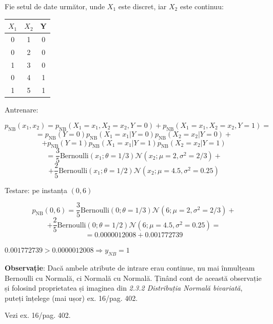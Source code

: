 \documentclass[12pt]{article}
\begin{document}
	Fie setul de date următor, unde $X_1$ este discret, iar $X_2$ este continuu:
	
	\begin{center}
		\begin{tabular}{ c|c||c }
			$X_1$ & $X_2$ & Y \\ 
			\hline
			 0& 1 & 0 \\  
			 0& 2 & 0 \\  
 			 1& 3 & 0 \\  
			 0& 4 & 1 \\  
			 1& 5 & 1 \\  
		\end{tabular}
	\end{center}
	
	Antrenare:
	
	$$p_\text{NB}(x_1,x_2) = p_\text{NB}(X_1=x_1,X_2=x_2,Y=0) + p_\text{NB}(X_1=x_1,X_2=x_2,Y=1) = $$
	$$ = p_\text{NB}(Y=0) p_\text{NB}(X_1=x_1|Y=0) p_\text{NB}(X_2=x_2|Y=0) +$$
	$$+ p_\text{NB}(Y=1) p_\text{NB}(X_1=x_1|Y=1) p_\text{NB}(X_2=x_2|Y=1) $$
	$$= \frac{3}{5} \text{Bernoulli}(x_1;\theta=1/3) \mathcal{N}(x_2;\mu=2,\sigma^2=2/3) + $$
	$$ + \frac{2}{5} \text{Bernoulli}(x_1;\theta=1/2) \mathcal{N}(x_2;\mu=4.5,\sigma^2=0.25)$$
	
	Testare: pe instanța $(0,6)$
	
	$$p_\text{NB}(0,6) = \frac{3}{5} \text{Bernoulli}(0;\theta=1/3) \mathcal{N}(6;\mu=2,\sigma^2=2/3) + $$
	$$ + \frac{2}{5} \text{Bernoulli}(0;\theta=1/2) \mathcal{N}(6;\mu=4.5,\sigma^2=0.25)=$$
	$$=0.0000012008 + 0.001772739$$
	
	$0.001772739 > 0.0000012008 \Rightarrow y_{NB} = 1$
	
	\textbf{Observație}: Dacă ambele atribute de intrare erau continue, nu mai înmulțeam Bernoulli cu Normală, ci Normală cu Normală. Ținând cont de această observație și folosind proprietatea și imaginea din \textit{2.3.2 Distribuția Normală bivariată}, puteți înțelege (mai ușor) ex. 16/pag. 402.
	
	Vezi ex. 16/pag. 402.
	
\end{document}
